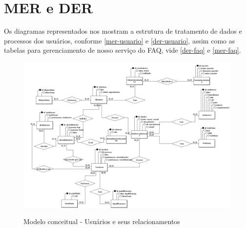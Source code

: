 \section{MER e DER}
Os diagramas representados nos mostram a estrutura de tratamento de dados e processos dos usuários, conforme \autoref{mer-usuario} e \autoref{der-usuario}, assim como as tabelas para gerenciamento de nosso serviço do FAQ, vide \autoref{der-faq} e \autoref{mer-faq}.

\begin{landscape}
\begin{figure}[h]
    \caption{Modelo conceitual - Usuários e seus relacionamentos}
    
    \centering %
    \includegraphics[width=19cm]{LaTeX/metaversoIFSP/anexos/MER-Usuarios.png} %
    \label{mer-usuario}
\end{figure}

\end{landscape}
